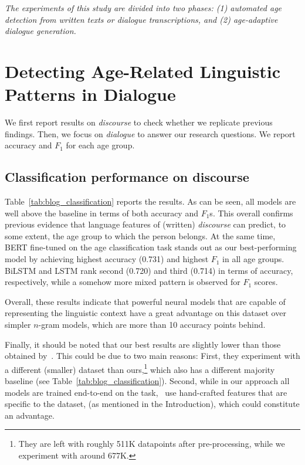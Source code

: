 \textit{The experiments of this study are divided into two phases: (1) automated age detection from written texts or dialogue transcriptions, and (2) age-adaptive dialogue generation.}

\section{Detecting Age-Related Linguistic Patterns in Dialogue}

We first report results on \emph{discourse}
to check whether we replicate
previous findings. Then, we focus on \emph{dialogue} to answer our research questions. We report accuracy and $F_1$ for each age group.

\subsection{Classification performance on discourse} Table~\ref{tab:blog_classification} reports the results.
As can be seen,
all models are well above the baseline in terms of both accuracy and 
$F_1$s. This overall confirms previous evidence \cite{schler2006effects} that language features of (written) \emph{discourse} can predict, to some extent, the age group to which the person
belongs. At the same time, BERT fine-tuned on the age classification task stands out as our best-performing model by achieving highest accuracy (0.731) and highest $F_1$ in all age groups.
BiLSTM and LSTM rank second (0.720) and third (0.714) in terms of accuracy, respectively, while a somehow more mixed pattern is observed for $F_1$ scores.

Overall, these results indicate that powerful neural models that are capable of representing the linguistic context %
have a great advantage on this dataset over simpler $n$-gram models, which are more than 10 accuracy points behind. 

Finally, it should be noted that our best results are slightly lower than those obtained by~\citet{schler2006effects}. This could be due to two main reasons: First, they experiment with a
different (smaller)
dataset than ours,\footnote{They are left with roughly 511K datapoints after pre-processing, 
while we experiment with around 677K.}
which also 
has 
a different majority baseline (see Table~\ref{tab:blog_classification}). Second, while in our approach all models are trained end-to-end on the task,~\citet{schler2006effects} use
hand-crafted features that are specific to the dataset, (as mentioned in the Introduction), 
which could constitute an advantage.

